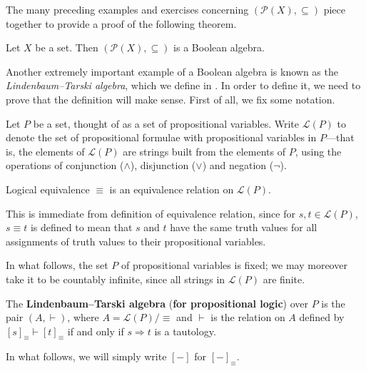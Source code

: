 The many preceding examples and exercises concerning $(\mathcal{P}(X), \subseteq)$ piece together to provide a proof of the following theorem.

\begin{theorem}
\label{thmPowerSetIsBooleanAlgebra}
Let $X$ be a set. Then $(\mathcal{P}(X), \subseteq)$ is a Boolean algebra.
\end{theorem}

Another extremely important example of a Boolean algebra is known as the \textit{Lindenbaum--Tarski algebra}, which we define in . In order to define it, we need to prove that the definition will make sense. First of all, we fix some notation.

\begin{definition}
Let $P$ be a set, thought of as a set of propositional variables. Write $\mathcal{L}(P)$ to denote the set of propositional formulae with propositional variables in $P$---that is, the elements of $\mathcal{L}(P)$ are strings built from the elements of $P$, using the operations of conjunction ($\wedge$), disjunction ($\vee$) and negation ($\neg$).
\end{definition}

\begin{lemma}
Logical equivalence $\equiv$ is an equivalence relation on $\mathcal{L}(P)$.
\end{lemma}
\begin{cproof}
This is immediate from definition of equivalence relation, since for $s,t \in \mathcal{L}(P)$, $s \equiv t$ is defined to mean that $s$ and $t$ have the same truth values for all assignments of truth values to their propositional variables.
\end{cproof}

In what follows, the set $P$ of propositional variables is fixed; we may moreover take it to be countably infinite, since all strings in $\mathcal{L}(P)$ are finite.

\begin{definition}
\label{defLindenbaumTarskiAlgebra}
The \textbf{Lindenbaum--Tarski algebra} (\textbf{for propositional logic}) over $P$ is the pair $(A, \vdash)$, where $A = \mathcal{L}(P)/{\equiv}$ and $\vdash$ is the relation on $A$ defined by $[s]_{\equiv} \vdash [t]_{\equiv}$ if and only if $s \Rightarrow t$ is a tautology.
\end{definition}

In what follows, we will simply write $[{-}]$ for $[{-}]_{\equiv}$.

